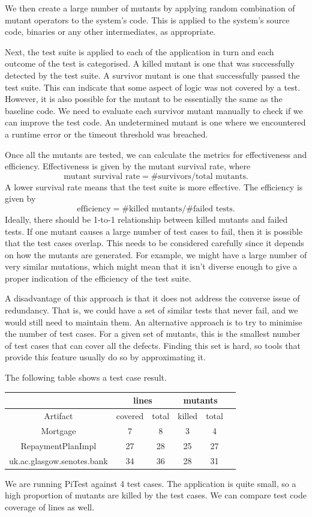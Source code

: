 \documentclass[a4paper, openany]{memoir}
\begin{document}
We then create a large number of mutants by applying random combination of mutant operators to the system's code. This is applied to the system's source code, binaries or any other intermediates, as appropriate. 

Next, the test suite is applied to each of the application in turn and each outcome of the test is categorised. A killed mutant is one that was successfully detected by the test suite. A survivor mutant is one that successfully passed the test suite. This can indicate that some aspect of logic was not covered by a test. However, it is also possible for the mutant to be essentially the same as the baseline code. We need to evaluate each survivor mutant manually to check if we can improve the test code. An undetermined mutant is one where we encountered a runtime error or the timeout threshold was breached.

Once all the mutants are tested, we can calculate the metrics for effectiveness and efficiency. Effectiveness is given by the mutant survival rate, where
\[\text{mutant survival rate} = \# \text{survivors}/\text{total mutants}.\]
A lower survival rate means that the test suite is more effective. The efficiency is given by
\[\text{efficiency} = \# \text{killed mutants}/\# \text{failed tests}.\]
Ideally, there should be 1-to-1 relationship between killed mutants and failed tests. If one mutant causes a large number of test cases to fail, then it is possible that the test cases overlap. This needs to be considered carefully since it depends on how the mutants are generated. For example, we might have a large number of very similar mutations, which might mean that it isn't diverse enough to give a proper indication of the efficiency of the test suite.

A disadvantage of this approach is that it does not address the converse issue of redundancy. That is, we could have a set of similar tests that never fail, and we would still need to maintain them. An alternative approach is to try to minimise the number of test cases. For a given set of mutants, this is the smallest number of test cases that can cover all the defects. Finding this set is hard, so tools that provide this feature usually do so by approximating it.

The following table shows a test case result.
\begin{table}[H]
    \centering
    \begin{tabular}{|c|c|c|c|c|c|}
        \hline
        & \multicolumn{2}{c|}{lines} & \multicolumn{2}{c|}{mutants} \\
        \hline
        Artifact & covered & total & killed & total \\
        \hline
        Mortgage & 7 & 8 & 3 & 4 \\
        RepaymentPlanImpl & 27 & 28 & 25 & 27 \\
        uk.ac.glasgow.senotes.bank & 34 & 36 & 28 & 31 \\
        \hline
    \end{tabular}
\end{table}
\noindent We are running PiTest against 4 test cases. The application is quite small, so a high proportion of mutants are killed by the test cases. We can compare test code coverage of lines as well.
\end{document}
